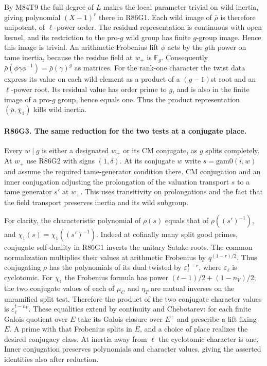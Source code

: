 By M84T9 the full degree of $L$ makes the local parameter trivial
on wild inertia, giving polynomial $(X-1)^r$ there in R86G1.
Each wild image of $\bar\rho$ is therefore unipotent, of
$\ell$-power order. The residual representation is continuous with
open kernel, and its restriction to the pro-$g$ wild group has
finite $g$-group image. Hence this image is trivial.
An arithmetic Frobenius lift $\phi$ acts by the $g$th power on tame
inertia, because the residue field at $w_+$ is $\mathbb F_g$.
Consequently
$\bar\rho(\phi\gamma\phi^{-1})=\bar\rho(\gamma)^g$ as matrices.
For the rank-one character the twist data express its value on each
wild element as a product of a $(g-1)$st root and an $\ell$-power
root. Its residual value has order prime to $g$, and is also in
the finite image of a pro-$g$ group, hence equals one. Thus the
product representation $(\bar\rho,\bar\chi_1)$ kills wild inertia.

\paragraph{R86G3. The same reduction for the two tests at a conjugate place.}
Every $w\mid g$ is either a designated $w_+$ or its CM conjugate,
as $g$ splits completely. At $w_+$ use R86G2 with signs
$(1,\delta)$. At its conjugate $w$ write $s=\mathrm{gam0}(i,w)$
and assume the required tame-generator condition there.
CM conjugation and an inner conjugation adjusting the prolongation
of the valuation transport $s$ to a tame generator $s'$ at
$w_+$. This uses transitivity on prolongations and the fact that
the field transport preserves inertia and its wild subgroup.

For clarity, the characteristic polynomial of $\rho(s)$ equals that
of $\rho((s')^{-1})$, and $\chi_1(s)=\chi_1((s')^{-1})$.
Indeed at cofinally many split good primes, conjugate
self-duality in R86G1 inverts the unitary Satake roots.
The common normalization multiplies their values at arithmetic
Frobenius by $q^{(1-r)/2}$. Thus conjugating $\rho$ has the
polynomials of its dual twisted by $\varepsilon_\ell^{1-r}$,
where $\varepsilon_\ell$ is cyclotomic. For $\chi_1$ the
Frobenius formula has power $(t-1)/2+(1-n_V)/2$; the two
conjugate values of each of $\mu_C$ and $\eta_T$ are mutual
inverses on the unramified split test. Therefore the product
of the two conjugate character values is
$\varepsilon_\ell^{t-n_V}$. These equalities extend by continuity
and Chebotarev: for each finite Galois quotient over $E$ take its
Galois closure over $E^+$ and prescribe a lift fixing $E$. A prime
with that Frobenius splits in $E$, and a choice of place realizes
the desired conjugacy class. At inertia away from $\ell$ the
cyclotomic character is one. Inner conjugation preserves
polynomials and character values, giving the asserted identities
also after reduction.

